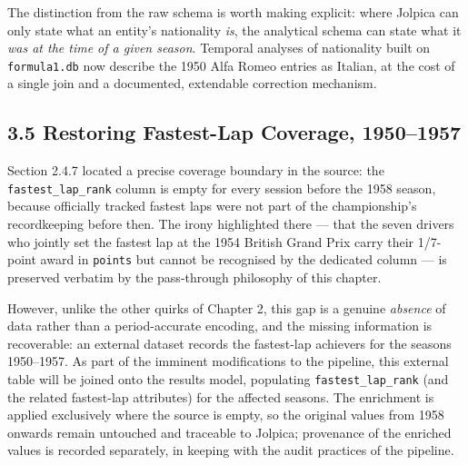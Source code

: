 \documentclass[
]{article}
\begin{document}
\begin{table}[!h]
\centering\begingroup\fontsize{8}{10}\selectfont

\endgroup{}
\end{table}

The distinction from the raw schema is worth making explicit: where
Jolpica can only state what an entity's nationality \emph{is}, the
analytical schema can state what it \emph{was at the time of a given
season}. Temporal analyses of nationality built on \texttt{formula1.db}
now describe the 1950 Alfa Romeo entries as Italian, at the cost of a
single join and a documented, extendable correction mechanism.

\newpage

\subsection{3.5 Restoring Fastest-Lap Coverage,
1950--1957}\label{restoring-fastest-lap-coverage-19501957}

Section 2.4.7 located a precise coverage boundary in the source: the
\texttt{fastest\_lap\_rank} column is empty for every session before the
1958 season, because officially tracked fastest laps were not part of
the championship's recordkeeping before then. The irony highlighted
there --- that the seven drivers who jointly set the fastest lap at the
1954 British Grand Prix carry their 1/7-point award in \texttt{points}
but cannot be recognised by the dedicated column --- is preserved
verbatim by the pass-through philosophy of this chapter.

However, unlike the other quirks of Chapter 2, this gap is a genuine
\emph{absence} of data rather than a period-accurate encoding, and the
missing information is recoverable: an external dataset records the
fastest-lap achievers for the seasons 1950--1957. As part of the
imminent modifications to the pipeline, this external table will be
joined onto the results model, populating \texttt{fastest\_lap\_rank}
(and the related fastest-lap attributes) for the affected seasons. The
enrichment is applied exclusively where the source is empty, so the
original values from 1958 onwards remain untouched and traceable to
Jolpica; provenance of the enriched values is recorded separately, in
keeping with the audit practices of the pipeline.
\end{document}
